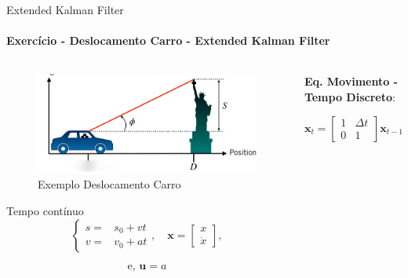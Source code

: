 \documentclass[aspectratio=169]{beamer}
\begin{document}
\begin{frame}[c]{Extended Kalman Filter}
    \framesubtitle{Exercício - Deslocamento Carro - Extended Kalman Filter}    \begin{columns}
        \begin{column}[c]{0.4\textwidth}
            \begin{figure}
                \centering
                \includegraphics[width=1\textwidth]{./images/kalman_car2.png}
                \caption{Exemplo Deslocamento Carro}
            \end{figure}
        
        Tempo contínuo
        \begin{equation*}
           \left\{
            \begin{matrix}
                s = & s_0 + vt \\
                v = & v_0 + at
            \end{matrix}, 
            \quad
            \mathbf{x} = 
            \begin{bmatrix}
                x \\
                \dot{x}
            \end{bmatrix},
            \right.
        \end{equation*}
        
        \begin{equation*}
            \text{e, }\mathbf{u}=a
        \end{equation*}

        \end{column}
        \begin{column}[c]{0.6\textwidth}
            
            \textbf{Eq. Movimento - Tempo Discreto}:

            \begin{equation*}
                \mathbf{x}_t = 
                \begin{bmatrix}
                        1 & \Delta t \\
                        0 & 1
                \end{bmatrix}
                \mathbf{x}_{t-1} +
                \begin{bmatrix}
                        0 \\
                        \Delta t
                \end{bmatrix}
                \mathbf{u}_{t-1} +
                \mathbf{w}_{t-1}
            \end{equation*}


\end{column}
\end{columns}
\end{frame}
\end{document}
